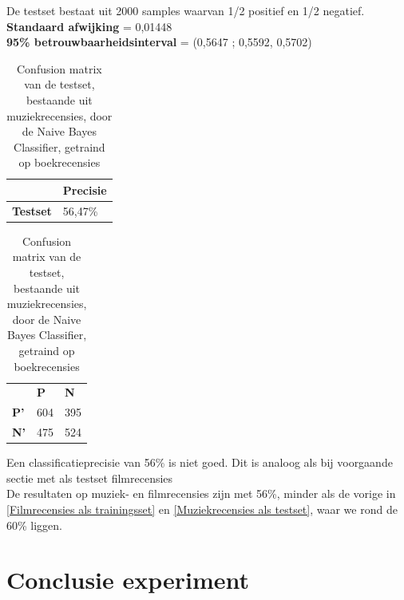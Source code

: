 De testset bestaat uit 2000 samples waarvan 1/2 positief en 1/2 negatief.\\
\textbf{Standaard afwijking} = 0,01448\\
\textbf{95\% betrouwbaarheidsinterval} = (0,5647 ; 0,5592, 0,5702)

\begin{table}[h]
\centering
\setlength\tabcolsep{4pt}
\begin{minipage}[t!]{0.48\textwidth}
\centering
\begin{tabular}{l|l|}
\cline{2-2}
                                            & \textbf{Precisie} \\ \hline
\multicolumn{1}{|l|}{\textbf{Testset}}      & 56,47\%           \\ \hline
\end{tabular}
\caption{Classificatieprecisie Naive Bayes Classifier, getraind op boekrecensies, getest op muziekrecensies}
\end{minipage}%
\hfill
\begin{minipage}[t!]{0.48\textwidth}
\centering
\begin{tabular}{lll}
                                 & \textbf{P}               & \textbf{N}               \\ \cline{2-3} 
\multicolumn{1}{l|}{\textbf{P'}} & \multicolumn{1}{l|}{604} & \multicolumn{1}{l|}{395} \\ \cline{2-3} 
\multicolumn{1}{l|}{\textbf{N'}} & \multicolumn{1}{l|}{475} & \multicolumn{1}{l|}{524} \\ \cline{2-3} 
\end{tabular}
\caption{Confusion matrix van de testset, bestaande uit muziekrecensies, door de  Naive Bayes Classifier, getraind op boekrecensies} 
\end{minipage}
\end{table}

Een classificatieprecisie van 56\% is niet goed. Dit is analoog als bij voorgaande sectie met als testset filmrecensies\\

De resultaten op muziek- en filmrecensies zijn met 56\%, minder als de vorige in \ref{Filmrecensies als trainingsset} en \ref{Muziekrecensies als testset}, waar we rond de 60\% liggen.

\section{Conclusie experiment}\label{Conclusie experiment}

